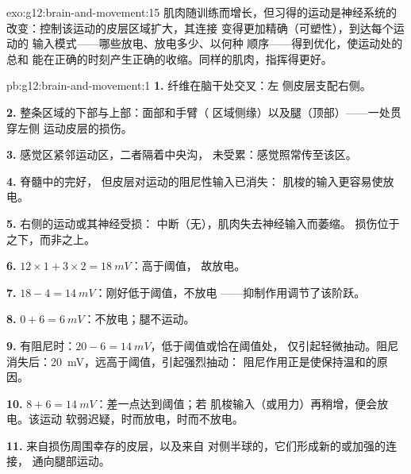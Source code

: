 \begin{solution}{exo:g12:brain-and-movement:15}
肌肉随训练而增长，但习得的运动是神经系统的
改变：控制该运动的皮层区域扩大，其连接
变得更加精确（可塑性），到达每个运动的
输入模式——哪些放电、放电多少、以何种
顺序——得到优化，使运动处的总和
能在正确的时刻产生正确的收缩。同样的肌肉，指挥得更好。
\end{solution}

\begin{solution}{pb:g12:brain-and-movement:1}
\textbf{1.} 纤维在脑干处交叉：左
侧皮层支配右侧。

\textbf{2.} 整条区域的下部与上部：面部和手臂（
区域侧缘）以及腿（顶部）——一处贯穿左侧
运动皮层的损伤。

\textbf{3.} 感觉区紧邻运动区，二者隔着中央沟，
未受累：感觉照常传至该区。

\textbf{4.} 脊髓中的完好，
但皮层对运动的阻尼性输入已消失：
肌梭的输入更容易使放电。

\textbf{5.} 右侧的运动或其神经受损：
中断（无），肌肉失去神经输入而萎缩。
损伤位于之下，而非之上。

\textbf{6.} $12 \times 1 + 3 \times 2 = \qty{18}{mV}$：高于阈值，
故放电。

\textbf{7.} $18 - 4 = \qty{14}{mV}$：刚好低于阈值，不放电
——抑制作用调节了该阶跃。

\textbf{8.} $0 + 6 = \qty{6}{mV}$：不放电；腿不运动。

\textbf{9.} 有阻尼时：$20 - 6 = \qty{14}{mV}$，低于阈值或恰在阈值处，
仅引起轻微抽动。阻尼消失后：\qty{20}{mV}，远高于阈值，引起强烈抽动：
阻尼作用正是使保持温和的原因。

\textbf{10.} $8 + 6 = \qty{14}{mV}$：差一点达到阈值；若
肌梭输入（或用力）再稍增，便会放电。该运动
软弱迟疑，时而放电，时而不放电。

\textbf{11.} 来自损伤周围幸存的皮层，以及来自
对侧半球的，它们形成新的或加强的连接，
通向腿部运动。


\end{solution}

